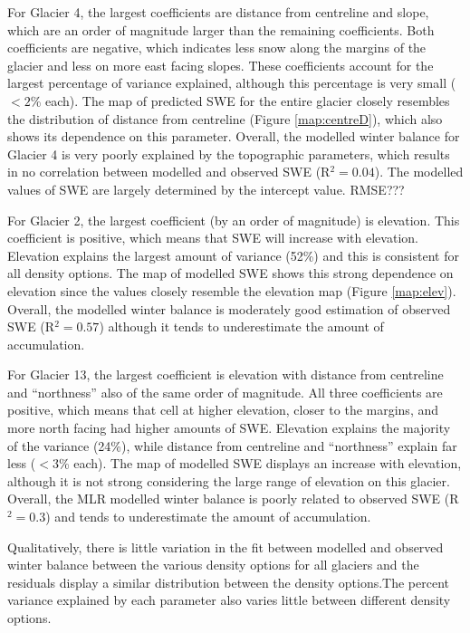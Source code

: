 \documentclass[12pt]{article}
\begin{document}
For Glacier 4, the largest coefficients are distance from centreline and slope, which are an order of magnitude larger than the remaining coefficients. Both coefficients are negative, which indicates less snow along the margins of the glacier and less on more east facing slopes. These coefficients account for the largest percentage of variance explained, although this percentage is very small ($<2$\% each). The map of predicted SWE for the entire glacier closely resembles the distribution of distance from centreline (Figure \ref{map:centreD}), which also shows its dependence on this parameter. Overall, the modelled winter balance for Glacier 4 is very poorly explained by the topographic parameters, which results in no correlation between modelled and observed SWE (R$^2=0.04$). The modelled values of SWE are largely determined by the intercept value. RMSE???

For Glacier 2, the largest coefficient (by an order of magnitude) is elevation. This coefficient is positive, which means that SWE will increase with elevation. Elevation explains the largest amount of variance (52\%) and this is consistent for all density options. The map of modelled SWE shows this strong dependence on elevation since the values closely resemble the elevation map (Figure \ref{map:elev}). Overall, the modelled winter balance is moderately good estimation of observed SWE (R$^2=0.57$) although it tends to underestimate the amount of accumulation. 

For Glacier 13, the largest coefficient is elevation with distance from centreline and ``northness'' also of the same order of magnitude. All three coefficients are positive, which means that cell at higher elevation, closer to the margins, and more north facing had higher amounts of SWE. Elevation explains the majority of the variance (24\%), while distance from centreline and ``northness'' explain far less ($<$3\% each). The map of modelled SWE displays an increase with elevation, although it is not strong considering the large range of elevation on this glacier. Overall, the MLR modelled winter balance is poorly related to observed SWE (R$^2=0.3$) and tends to underestimate the amount of accumulation.

Qualitatively, there is little variation in the fit between modelled and observed winter balance between the various density options for all glaciers and the residuals display a similar distribution between the density options.The percent variance explained by each parameter also varies little between different density options. 
\end{document}
